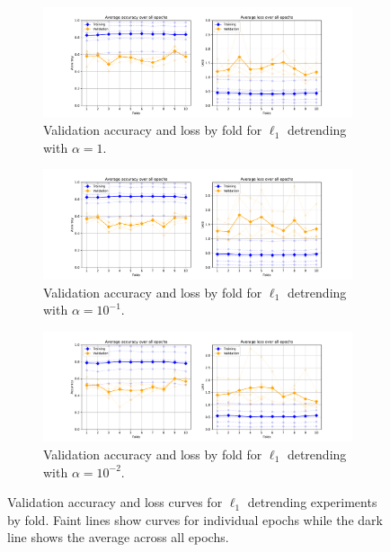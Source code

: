 \begin{figure}[htbp]
    \centering
    \begin{subfigure}{\textwidth}
        \centering
        \includegraphics[trim={3cm 0 3cm 0.8cm},clip,width=\textwidth]{img/ch5/e0_3_epochs_by_fold.pdf}
        \caption{Validation accuracy and loss by fold for $\ell_1$ detrending with $\alpha = 1$.}
        \label{fig:detrend-acc-loss-e0-fold}
    \end{subfigure}

    \vspace{0.5cm}
    
    \begin{subfigure}{\textwidth}
        \centering
        \includegraphics[trim={3cm 0 3cm 0.8cm},clip,width=\textwidth]{img/ch5/e-1_3_epochs_by_fold.pdf}
        \caption{Validation accuracy and loss by fold for $\ell_1$ detrending with $\alpha = 10^{-1}$.}
        \label{fig:detrend-acc-loss-e-1-fold}
    \end{subfigure}

    \vspace{0.5cm}
    
    \begin{subfigure}{\textwidth}
        \centering
        \includegraphics[trim={3cm 0 3cm 0.8cm},clip,width=\textwidth]{img/ch5/e-2_3_epochs_by_fold.pdf}
        \caption{Validation accuracy and loss by fold for $\ell_1$ detrending with $\alpha = 10^{-2}$.}
        \label{fig:detrend-acc-loss-e-2-fold}
    \end{subfigure}
    \caption{Validation accuracy and loss curves for $\ell_1$ detrending experiments by fold. Faint lines show curves for individual epochs while the dark line shows the average across all epochs.} 
    \label{fig:detrend-acc-loss-curves-fold}
\end{figure}

